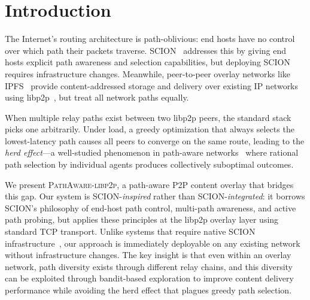 \documentclass[sigconf,nonacm]{acmart}
\begin{document}
\maketitle

\section{Introduction}
\label{sec:intro}

The Internet's routing architecture is path-oblivious: end hosts have no control over which path their packets traverse. SCION~\cite{perrig2017scion} addresses this by giving end hosts explicit path awareness and selection capabilities, but deploying SCION requires infrastructure changes. Meanwhile, peer-to-peer overlay networks like IPFS~\cite{benet2014ipfs} provide content-addressed storage and delivery over existing IP networks using libp2p~\cite{libp2p}, but treat all network paths equally.

When multiple relay paths exist between two libp2p peers, the standard stack picks one arbitrarily. Under load, a greedy optimization that always selects the lowest-latency path causes all peers to converge on the same route, leading to the \emph{herd effect}---a well-studied phenomenon in path-aware networks~\cite{pathselection2025} where rational path selection by individual agents produces collectively suboptimal outcomes.

We present \textsc{PathAware-libp2p}, a path-aware P2P content overlay that bridges this gap. Our system is SCION-\emph{inspired} rather than SCION-\emph{integrated}: it borrows SCION's philosophy of end-host path control, multi-path awareness, and active path probing, but applies these principles at the libp2p overlay layer using standard TCP transport. Unlike systems that require native SCION infrastructure~\cite{gartner2025ipfs,btscion2023}, our approach is immediately deployable on any existing network without infrastructure changes. The key insight is that even within an overlay network, path diversity exists through different relay chains, and this diversity can be exploited through bandit-based exploration to improve content delivery performance while avoiding the herd effect that plagues greedy path selection.
\end{document}
